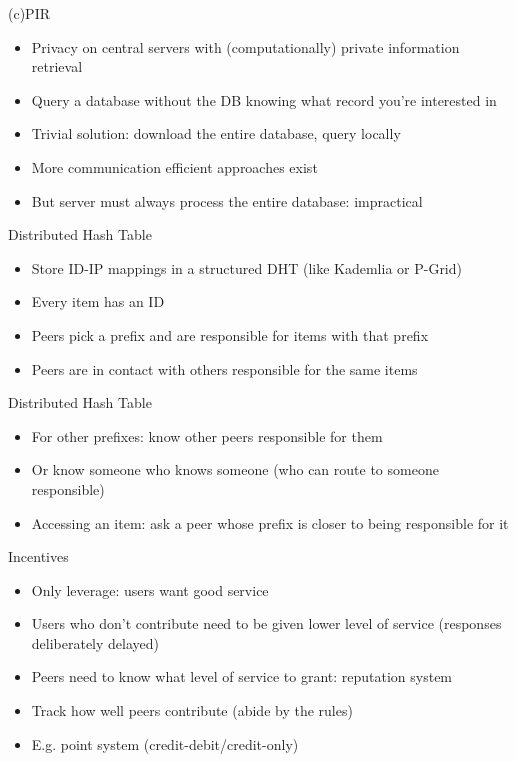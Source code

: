 \documentclass[presentation,english]{beamer}
\begin{document}
\begin{frame}{(c)PIR}
  \begin{itemize}
    \item Privacy on central servers with (computationally) private information
          retrieval
    \item Query a database without the DB knowing what record you're interested
          in
    \item Trivial solution: download the entire database, query locally
    \item More communication efficient approaches exist
    \item But server must always process the entire database: impractical
  \end{itemize}
\end{frame}

\begin{frame}{Distributed Hash Table}
  \begin{itemize}
    \item Store ID-IP mappings in a structured DHT (like Kademlia or P-Grid)
    \item Every item has an ID
    \item Peers pick a prefix and are responsible for items with that prefix
    \item Peers are in contact with others responsible for the same items
  \end{itemize}
\end{frame}

\begin{frame}{Distributed Hash Table}
  \begin{itemize}
    \item For other prefixes: know other peers responsible for them
    \item Or know someone who knows someone (who can route to someone
          responsible)
    \item Accessing an item: ask a peer whose prefix is closer to being
          responsible for it
  \end{itemize}
\end{frame}

\begin{frame}{Incentives}
  \begin{itemize}
    \item Only leverage: users want good service
    \item Users who don't contribute need to be given lower level of service
          (responses deliberately delayed)
    \item Peers need to know what level of service to grant: reputation system
    \item Track how well peers contribute (abide by the rules)
    \item E.g. point system (credit-debit/credit-only)
  \end{itemize}
\end{frame}
\end{document}
